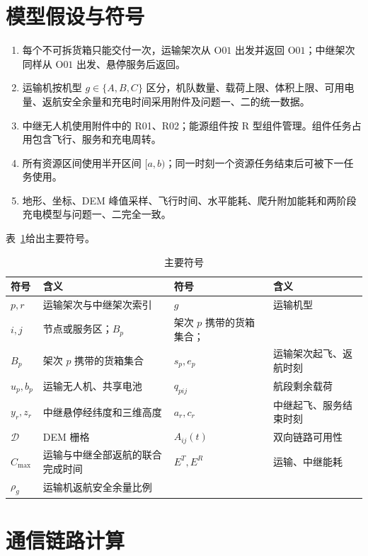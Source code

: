 \documentclass[UTF8,a4paper,12pt]{ctexart}
\newcommand{\Oone}{\mathrm{O01}}
\begin{document}
\section{模型假设与符号}

\begin{enumerate}[label=(A\arabic*)]
\item 每个不可拆货箱只能交付一次，运输架次从 $\Oone$ 出发并返回 $\Oone$；中继架次同样从 $\Oone$ 出发、悬停服务后返回。
\item 运输机按机型 $g\in\{A,B,C\}$ 区分，机队数量、载荷上限、体积上限、可用电量、返航安全余量和充电时间采用附件及问题一、二的统一数据。
\item 中继无人机使用附件中的 R01、R02；能源组件按 R 型组件管理。组件任务占用包含飞行、服务和充电周转。
\item 所有资源区间使用半开区间 $[a,b)$；同一时刻一个资源任务结束后可被下一任务使用。
\item 地形、坐标、DEM 峰值采样、飞行时间、水平能耗、爬升附加能耗和两阶段充电模型与问题一、二完全一致。
\end{enumerate}

表~\ref{tab:symbol}给出主要符号。
\begin{table}[H]\centering\caption{主要符号}\label{tab:symbol}
\begin{tabular}{p{2.2cm}p{4.4cm}p{2.2cm}p{4.4cm}}
\toprule
符号&含义&符号&含义\\\midrule
$p,r$&运输架次与中继架次索引&$g$&运输机型\\
$i,j$&节点或服务区；$B_p$&架次 $p$ 携带的货箱集合；\\
$B_p$&架次 $p$ 携带的货箱集合&$s_p,e_p$&运输架次起飞、返航时刻\\
$u_p,b_p$&运输无人机、共享电池&$q_{pij}$&航段剩余载荷\\
$y_r,z_r$&中继悬停经纬度和三维高度&$a_r,c_r$&中继起飞、服务结束时刻\\
$\mathcal{D}$&DEM 栅格&$A_{ij}(t)$&双向链路可用性\\
$C_{\max}$&运输与中继全部返航的联合完成时间&$E^T,E^R$&运输、中继能耗\\
$\rho_g$&运输机返航安全余量比例&&\\
\bottomrule
\end{tabular}\end{table}

\section{通信链路计算}
\end{document}

